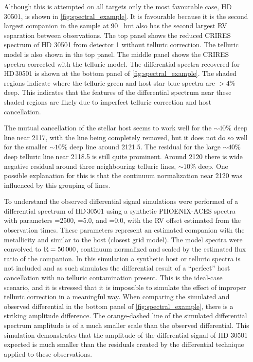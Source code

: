 Although this is attempted on all targets only the most favourable case, {HD\,30501}, is shown in \cref{fig:spectral_example}.
It is favourable because it is the second largest companion in the sample at 90~\Mjup{} but also has the second largest {RV} separation between observations.
The top panel shows the reduced CRIRES spectrum of {HD 30501} from detector 1 without telluric correction.
The telluric model is also shown in the top panel.
The middle panel shows the CRIRES spectra corrected with the telluric model.
The differential spectra recovered for {HD\,30501} is shown at the bottom panel of \cref{fig:spectral_example}.
The shaded regions indicate where the telluric {green} and host star {blue} spectra are \(> 4\%\) deep.
This indicates that the features of the differential spectrum near these shaded regions are likely due to imperfect telluric correction and host cancellation.

The mutual cancellation of the stellar host seems to work well for the \(\sim40\%\) deep line near 2117\nm{}, with the line being completely removed, but it does not do so well for the smaller \(\sim10\%\) deep line around 2121.5\nm{}.
The residual for the large \(\sim40\%\) deep telluric line near 2118.5\nm{} is still quite prominent.
Around 2120\nm{} there is wide negative residual around three neighbouring telluric lines, \(\sim10\%\) deep.
One possible explanation for this is that the continuum normalization near 2120\nm{} was influenced by this grouping of lines.

To understand the observed differential signal simulations were performed of a differential spectrum of {HD\,30501} using a synthetic {PHOENIX-ACES} spectra with parameters \Teff{}=2500\K{}, \Logg{}=5.0, and \feh{}=0.0, with the {RV} offset estimated from the observation times.
These parameters represent an estimated companion \Teff{} with the metallicity and \Logg{} similar to the host (closest grid model).
The model spectra were convolved to \(\textrm{R}=50\,000\), continuum normalized and scaled by the estimated flux ratio of the companion.
In this simulation a synthetic host or telluric spectra is not included and as such simulates the differential result of a ``perfect'' host cancellation with no telluric contamination present.
This is the ideal-case scenario, and it is stressed that it is impossible to simulate the effect of improper telluric correction in a meaningful way.
When comparing the simulated and observed differential in the bottom panel of \cref{fig:spectral_example}, there is a striking amplitude difference.
The orange-dashed line of the simulated differential spectrum amplitude is of a much smaller scale than the observed differential.
This simulation demonstrates that the amplitude of the differential signal of {HD 30501} expected is much smaller than the residuals created by the differential technique applied to these observations.

